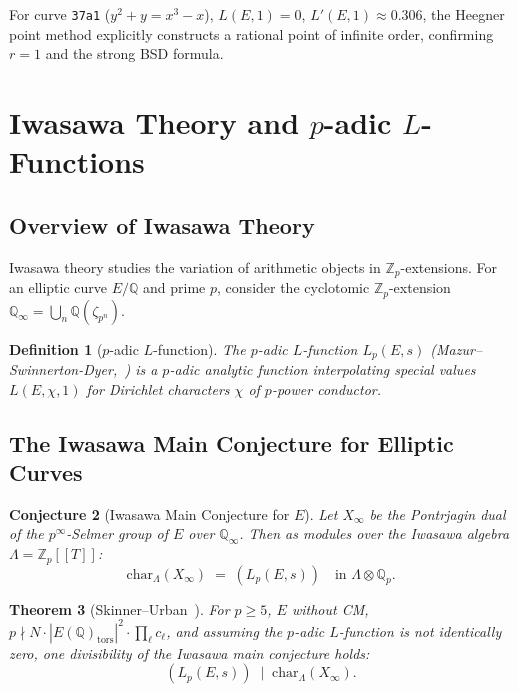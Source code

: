 \documentclass[12pt,a4paper]{article}
\newtheorem{theorem}{Theorem}[section]
\newtheorem{conjecture}[theorem]{Conjecture}
\newtheorem{definition}[theorem]{Definition}
\theoremstyle{remark}
\begin{document}
For curve \texttt{37a1} ($y^2 + y = x^3 - x$), $L(E,1)=0$, $L'(E,1) \approx 0.306$,
the Heegner point method explicitly constructs a rational point of infinite order, confirming
$r=1$ and the strong BSD formula.

\section{Iwasawa Theory and $p$-adic $L$-Functions}

\subsection{Overview of Iwasawa Theory}

Iwasawa theory studies the variation of arithmetic objects in $\mathbb{Z}_p$-extensions.
For an elliptic curve $E/\mathbb{Q}$ and prime $p$, consider the cyclotomic
$\mathbb{Z}_p$-extension $\mathbb{Q}_\infty = \bigcup_n \mathbb{Q}(\zeta_{p^n})$.

\begin{definition}[$p$-adic $L$-function]
  The $p$-adic $L$-function $L_p(E, s)$ (Mazur--Swinnerton-Dyer,~\cite{MazurSD1974}) is a
  $p$-adic analytic function interpolating special values $L(E, \chi, 1)$ for Dirichlet
  characters $\chi$ of $p$-power conductor.
\end{definition}

\subsection{The Iwasawa Main Conjecture for Elliptic Curves}

\begin{conjecture}[Iwasawa Main Conjecture for $E$]
  Let $X_\infty$ be the Pontrjagin dual of the $p^\infty$-Selmer group of $E$ over
  $\mathbb{Q}_\infty$.  Then as modules over the Iwasawa algebra $\Lambda = \mathbb{Z}_p[[T]]$:
  \[
    \mathrm{char}_\Lambda(X_\infty) \;=\; (L_p(E, s))
    \quad \text{in } \Lambda \otimes \mathbb{Q}_p.
  \]
\end{conjecture}

\begin{theorem}[Skinner--Urban~\cite{SkinnerUrban2014}]
  For $p \geq 5$, $E$ without CM, $p \nmid N \cdot |E(\mathbb{Q})_{\mathrm{tors}}|^2 \cdot \prod_\ell c_\ell$,
  and assuming the $p$-adic $L$-function is not identically zero, one divisibility of the
  Iwasawa main conjecture holds:
  \[
    (L_p(E, s)) \;\mid\; \mathrm{char}_\Lambda(X_\infty).
  \]
\end{theorem}
\end{document}
